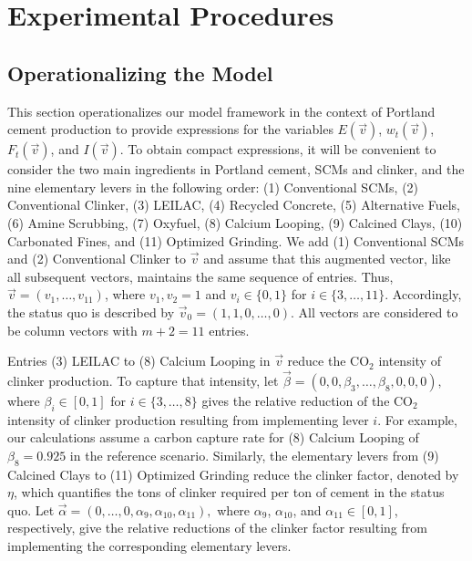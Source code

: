\documentclass[12pt, a4paper]{article} %
\begin{document}
\section*{Experimental Procedures}
\label{sec: methods}

\renewcommand{\figurename}{Extended Data Figure}
\renewcommand{\tablename}{Extended Data Table}
\setcounter{figure}{0}
\setcounter{table}{0}

\subsection*{Operationalizing the Model}

This section operationalizes our model framework in the context of Portland cement production to provide expressions for the variables $E(\vec{v})$, $w_t(\vec{v})$, $F_t(\vec{v})$, and $I(\vec{v})$. To obtain compact expressions, it will be convenient to consider the two main ingredients in Portland cement, SCMs and clinker, and the nine elementary levers in the following order: (1) Conventional SCMs, (2) Conventional Clinker, (3) LEILAC, (4) Recycled Concrete, (5) Alternative Fuels, (6) Amine Scrubbing, (7) Oxyfuel, (8) Calcium Looping, (9) Calcined Clays, (10) Carbonated Fines, and (11) Optimized Grinding. We add (1) Conventional SCMs and (2) Conventional Clinker to $\vec{v}$ and assume that this augmented vector, like all subsequent vectors, maintains the same sequence of entries. Thus, $\vec{v} = (v_1, \ldots, v_{11})$, where $v_1, v_2 = 1$ and $v_i \in \{0,1\}$ for $i \in \{3,\ldots,11\}$. Accordingly, the status quo is described by $\vec{v}_0 = (1, 1, 0, \ldots, 0)$. All vectors are considered to be column vectors with $m+2 = 11$ entries.

Entries (3) LEILAC to (8) Calcium Looping in $\vec{v}$ reduce the CO$_2$ intensity of clinker production. To capture that intensity, let $\vec{\beta} = (0, 0, \beta_3, \ldots , \beta_8, 0, 0, 0),$ where $\beta_i \in [0,1]$ for $i \in \{3,\ldots,8\}$ gives the relative reduction of the CO$_2$ intensity of clinker production resulting from implementing lever $i$. For example, our calculations assume a carbon capture rate for (8) Calcium Looping of $\beta_8 = 0.925$ in the reference scenario. Similarly, the elementary levers from (9) Calcined Clays to (11) Optimized Grinding reduce the clinker factor, denoted by $\eta$, which quantifies the tons of clinker required per ton of cement in the status quo. Let $\vec{\alpha} = (0, \ldots, 0, \alpha_9, \alpha_{10}, \alpha_{11}),$ where $\alpha_9$, $\alpha_{10}$, and $\alpha_{11} \in [0,1]$, respectively, give the relative reductions of the clinker factor resulting from implementing the corresponding elementary levers.
\end{document}
